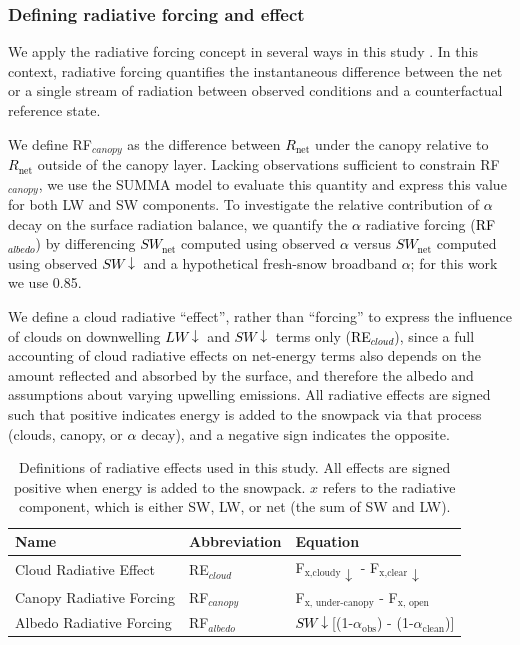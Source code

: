 \documentclass[draft]{agujournal2019}
\newcommand{\lwdn}{\textcolor{black}{$LW\downarrow$}\xspace}
\newcommand{\rnet}{\textcolor{black}{$R_{\mathrm{net}}$}\xspace}
\newcommand{\swnet}{\textcolor{black}{$SW_{\mathrm{net}}$}\xspace}
\newcommand{\swdn}{\textcolor{black}{$SW\downarrow$}\xspace}
\newcommand{\albedo}{\textcolor{black}{$\alpha$}\xspace}
\newcommand{\rfalb}{\textcolor{black}{RF$_{albedo}$}\xspace}
\newcommand{\rfcirrus}{\textcolor{black}{RE$_{cloud}$}\xspace}
\begin{document}
\subsubsection{Defining radiative forcing and effect}\label{sec:methods:radforce}
We apply the radiative forcing concept in several ways in this study \cite{Ramanathan1989-pa, Deems2013-vv, Rudisill2025-cx}.
In this context, radiative forcing quantifies the instantaneous difference between the net or a single stream of radiation between observed conditions and a counterfactual reference state.

We define RF$_{canopy}$ as the difference between \rnet under the canopy relative to \rnet outside of the canopy layer.
Lacking observations sufficient to constrain RF$_{canopy}$, we use the SUMMA model to evaluate this quantity and express this value for both LW and SW components.
To investigate the relative contribution of \albedo decay on the surface radiation balance, we quantify the \albedo radiative forcing (\rfalb) by differencing \swnet computed using observed \albedo versus \swnet computed using observed \swdn and a hypothetical fresh-snow broadband \albedo; for this work we use 0.85.

We define a cloud radiative ``effect'', rather than ``forcing'' to express the influence of clouds on downwelling \lwdn and \swdn terms only (\rfcirrus), since a full accounting of cloud radiative effects on net-energy terms also depends on the amount reflected and absorbed by the surface, and therefore the albedo \cite{Rudisill2025-cx} and assumptions about varying upwelling emissions.
All radiative effects are signed such that positive indicates energy is added to the snowpack via that process (clouds, canopy, or \albedo decay), and a negative sign indicates the opposite.

\begin{table}[h]
\centering
\caption{Definitions of radiative effects used in this study.
All effects are signed positive when energy is added to the snowpack.
$x$ refers to the radiative component, which is either SW, LW, or net (the sum of SW and LW).}
\label{tab:radiative_effects}
\begin{tabular}{lll}
\hline
\textbf{Name} & \textbf{Abbreviation} & \textbf{Equation} \\
\hline
Cloud Radiative Effect          & RE$_{cloud}$      & F$_\text{x,cloudy}\downarrow$    - F$_\text{x,clear}\downarrow$ \\
Canopy Radiative Forcing        & RF$_{canopy}$     & F$_\text{x, under-canopy}$   - F$_\text{x, open}$ \\
Albedo Radiative Forcing        & RF$_{albedo}$     & \swdn[(1-$\alpha_\text{obs}$)  - (1-$\alpha_\text{clean}$)]\\
\hline
\end{tabular}
\end{table}
\end{document}
